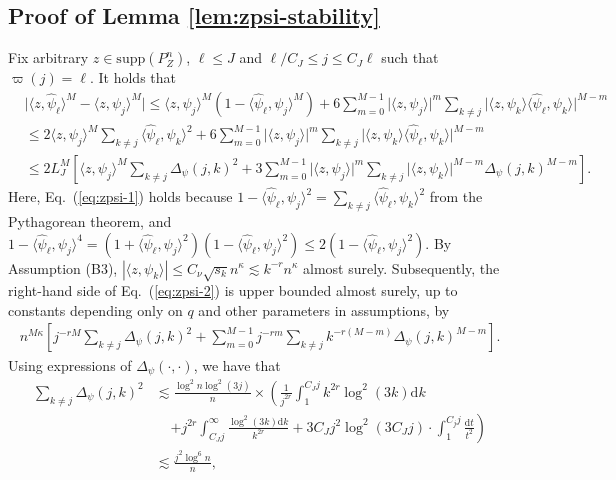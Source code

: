 \documentclass[11pt,a4paper]{article}
\renewcommand{\hat}{\widehat}
\theoremstyle{definition}
\theoremstyle{plain}
\theoremstyle{remark}
\newcommand{\supp}{\mathrm{supp}}
\newcommand{\ud}{\mathrm d}
\begin{document}
\subsection{Proof of Lemma \ref{lem:zpsi-stability}}
Fix arbitrary $z\in\supp(P_Z^n)$, $\ell\leq J$ and $\ell/C_J\leq j\leq C_J\ell$ such that $\varpi(j)=\ell$. It holds that
\begin{align}
&\big|\langle z,\hat\psi_\ell\rangle^M-\langle z,\psi_j\rangle^M\big| \leq \langle z,\psi_j\rangle^M(1-\langle\hat\psi_\ell,\psi_j\rangle^M) + 6\sum_{m=0}^{M-1}\big|\langle z,\psi_j\rangle\big|^m\sum_{k\neq j}\big|\langle z,\psi_k\rangle\langle\hat\psi_\ell,\psi_k\rangle\big|^{M-m}\nonumber\\
&\leq 2\langle z,\psi_j\rangle^M\sum_{k\neq j}\langle\hat\psi_\ell,\psi_k\rangle^2 +  6\sum_{m=0}^{M-1}\big|\langle z,\psi_j\rangle\big|^m\sum_{k\neq j}\big|\langle z,\psi_k\rangle\langle\hat\psi_\ell,\psi_k\rangle\big|^{M-m}\label{eq:zpsi-1}\\
&\leq 2L_J^M\left[\langle z,\psi_j\rangle^M\sum_{k\neq j}\Delta_\psi(j,k)^2 +3 \sum_{m=0}^{M-1}\big|\langle z,\psi_j\rangle\big|^m\sum_{k\neq j}\big|\langle z,\psi_k\rangle\big|^{M-m}\Delta_\psi(j,k)^{M-m} \right].\label{eq:zpsi-2}
\end{align}
Here, Eq.~(\ref{eq:zpsi-1}) holds because $1-\langle\hat\psi_\ell,\psi_j\rangle^2=\sum_{k\neq j}\langle\hat\psi_\ell,\psi_k\rangle^2$ from the Pythagorean theorem,
and $1-\langle\hat\psi_\ell,\psi_j\rangle^4 = (1+\langle\hat\psi_\ell,\psi_j\rangle^2)(1-\langle\hat\psi_\ell,\psi_j\rangle^2) \leq 2(1-\langle\hat\psi_\ell,\psi_j\rangle^2)$.
By Assumption (B3), $|\langle z,\psi_k\rangle|\leq C_\nu\sqrt{s_k}n^{\kappa} \lesssim k^{-r}n^{\kappa}$ almost surely.
Subsequently, the right-hand side of Eq.~(\ref{eq:zpsi-2}) is upper bounded almost surely, up to constants depending only on $q$ and other parameters in assumptions, by
\begin{align}
 n^{M\kappa}\left[j^{-rM}\sum_{k\neq j}\Delta_\psi(j,k)^2 + \sum_{m=0}^{M-1} j^{-rm}\sum_{k\neq j}k^{-r(M-m)}\Delta_\psi(j,k)^{M-m} \right].
 \label{eq:zpsi-3}
\end{align}
Using expressions of $\Delta_\psi(\cdot,\cdot)$, we have that
\begin{align}
\sum_{k\neq j}\Delta_\psi(j,k)^2 &\lesssim \frac{\log^2 n\log^2(3j)}{n}\times \left( \frac{1}{j^{2r}}\int_1^{C_J j} k^{2r}\log^2(3k)\ud k \right.\nonumber\\
&\;\;\;\;\left.+ j^{2r}\int_{C_J j}^{\infty}\frac{\log^2(3k)\ud k}{k^{2r}} + 3C_J j^2\log^2(3C_Jj)\cdot \int_1^{C_j j}\frac{\ud t}{t^2}\right)\nonumber\\
&\lesssim \frac{j^2\log^6 n}{n},\label{eq:zpsi-4}
\end{align}
\end{document}
